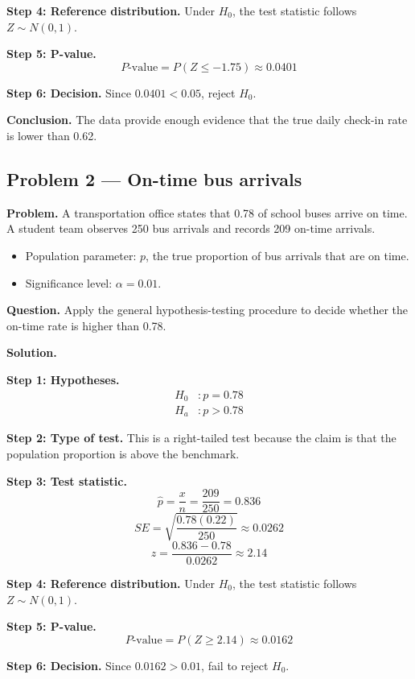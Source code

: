 \begin{ExamProblems}
\textbf{Step 4: Reference distribution.} Under \(H_0\), the test statistic follows \(Z\sim N(0,1)\).

\textbf{Step 5: P-value.}
\[
P\text{-value}=P(Z\le -1.75)\approx 0.0401
\]

\textbf{Step 6: Decision.} Since \(0.0401<0.05\), reject \(H_0\).

\textbf{Conclusion.} The data provide enough evidence that the true daily check-in rate is lower than 0.62.

\hypertarget{c4-ex2}{}
\item
\subsection*{Problem 2 — On-time bus arrivals}

\textbf{Problem.} A transportation office states that 0.78 of school buses arrive on time. A student team observes 250 bus arrivals and records 209 on-time arrivals.
\begin{itemize}
    \item Population parameter: \(p\), the true proportion of bus arrivals that are on time.
    \item Significance level: \(\alpha=0.01\).
\end{itemize}

\textbf{Question.} Apply the general hypothesis-testing procedure to decide whether the on-time rate is higher than 0.78.

\textbf{Solution.}

\textbf{Step 1: Hypotheses.}
\[
\begin{aligned}
H_0&: p = 0.78 \\
H_a&: p > 0.78
\end{aligned}
\]

\textbf{Step 2: Type of test.} This is a right-tailed test because the claim is that the population proportion is above the benchmark.

\textbf{Step 3: Test statistic.}
\[
\hat{p}=\frac{x}{n}=\frac{209}{250}=0.836
\]
\[
SE=\sqrt{\frac{0.78(0.22)}{250}}\approx 0.0262
\]
\[
z=\frac{0.836-0.78}{0.0262}\approx 2.14
\]

\textbf{Step 4: Reference distribution.} Under \(H_0\), the test statistic follows \(Z\sim N(0,1)\).

\textbf{Step 5: P-value.}
\[
P\text{-value}=P(Z\ge 2.14)\approx 0.0162
\]

\textbf{Step 6: Decision.} Since \(0.0162>0.01\), fail to reject \(H_0\).


\end{ExamProblems}
